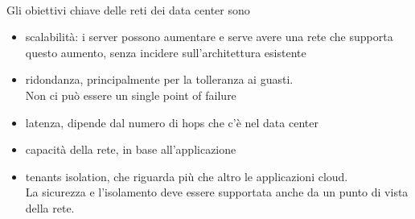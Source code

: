 \documentclass[12pt, oneside]{extbook} %
\begin{document}
\\Gli obiettivi chiave delle reti dei data center sono
\begin{itemize}
    \item scalabilità: i server possono aumentare e serve avere una rete che supporta questo aumento, senza incidere sull'architettura esistente
    \item ridondanza, principalmente per la tolleranza ai guasti.
    \\Non ci può essere un single point of failure
    \item latenza, dipende dal numero di hops che c'è nel data center
    \item capacità della rete, in base all'applicazione 
    \item tenants isolation, che riguarda più che altro le applicazioni cloud.
    \\La sicurezza e l'isolamento deve essere supportata anche da un punto di vista della rete.
\end{itemize}
\end{document}
